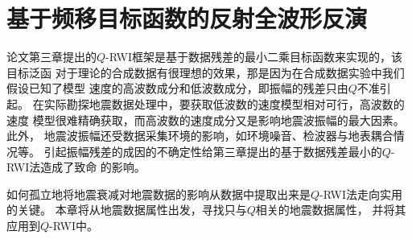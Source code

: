 
\chapter{基于频移目标函数的反射全波形反演}

论文第三章提出的$Q$-RWI框架是基于数据残差的最小二乘目标函数来实现的，该目标泛函
对于理论的合成数据有很理想的效果，那是因为在合成数据实验中我们假设已知了模型
速度的高波数成分和低波数成分，即振幅的残差只由$Q$不准引起。
在实际勘探地震数据处理中，要获取低波数的速度模型相对可行，高波数的速度
模型很难精确获取，而高波数的速度成分又是影响地震波振幅的最大因素。此外，
地震波振幅还受数据采集环境的影响，如环境噪音、检波器与地表耦合情况等。
引起振幅残差的成因的不确定性给第三章提出的基于数据残差最小的$Q$-RWI法造成了致命
的影响。

如何孤立地将地震衰减对地震数据的影响从数据中提取出来是$Q$-RWI法走向实用的关键。
本章将从地震数据属性出发，寻找只与$Q$相关的地震数据属性，
并将其应用到$Q$-RWI中。

\vspace{1.0cm}

